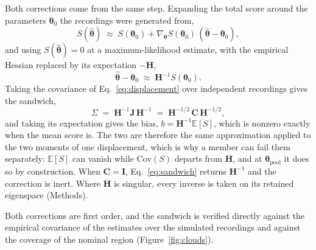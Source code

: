 \begin{appendixbox}
Both corrections come from the same step. Expanding the total score around the parameters
$\boldsymbol{\theta}_0$ the recordings were generated from,
\begin{equation}
  S(\hat{\boldsymbol{\theta}}) \;\approx\; S(\boldsymbol{\theta}_0)
    + \nabla_{\boldsymbol{\theta}} S(\boldsymbol{\theta}_0)\,(\hat{\boldsymbol{\theta}}-\boldsymbol{\theta}_0),
  \label{eq:score-expansion}
\end{equation}
and using $S(\hat{\boldsymbol{\theta}})=0$ at a maximum-likelihood estimate, with the empirical Hessian
replaced by its expectation $-\mathbf{H}$,
\begin{equation}
  \hat{\boldsymbol{\theta}}-\boldsymbol{\theta}_0 \;\approx\; \mathbf{H}^{-1}S(\boldsymbol{\theta}_0).
  \label{eq:displacement}
\end{equation}
Taking the covariance of Eq.~\ref{eq:displacement} over independent recordings gives the sandwich,
\begin{equation}
  \Sigma \;=\; \mathbf{H}^{-1}\mathbf{J}\,\mathbf{H}^{-1}
   \;=\; \mathbf{H}^{-1/2}\,\mathbf{C}\,\mathbf{H}^{-1/2},
  \label{eq:sandwich}
\end{equation}
and taking its expectation gives the bias, $b=\mathbf{H}^{-1}\mathbb{E}[S]$, which is nonzero
exactly when the mean score is. The two are therefore the same approximation applied to the two
moments of one displacement, which is why a member can fail them separately: $\mathbb{E}[S]$ can
vanish while $\mathrm{Cov}(S)$ departs from $\mathbf{H}$, and at $\boldsymbol{\theta}_{\mathrm{pool}}$ it
does so by construction. When $\mathbf{C}=\mathbf{I}$, Eq.~\ref{eq:sandwich} returns
$\mathbf{H}^{-1}$ and the correction is inert. Where $\mathbf{H}$ is singular, every inverse is
taken on its retained eigenspace (Methods).

Both corrections are first order, and the sandwich is verified directly against the empirical
covariance of the estimates over the simulated recordings and against the coverage of the nominal
region (Figure~\ref{fig:clouds}).


\end{appendixbox}

